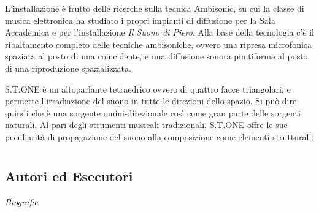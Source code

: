 \documentclass[9pt, twoside, a5paper]{extreport}
\begin{document}
\begin{multicols}{2}

\noindent L'installazione è frutto delle ricerche sulla tecnica Ambisonic, su cui la classe di musica elettronica ha studiato i propri impianti di diffusione per la Sala Accademica e per l'installazione \textit{Il Suono di Piero}. Alla base della tecnologia c'è il ribaltamento completo delle tecniche ambisoniche, ovvero una ripresa microfonica spaziata al posto di una coincidente, e una diffusione sonora puntiforme al posto di una riproduzione spazializzata.

S.T.ONE è un altoparlante tetraedrico ovvero di quattro facce triangolari, e permette l'irradiazione del suono in tutte le direzioni dello spazio. Si può dire quindi che è una sorgente omini-direzionale così come gran parte delle sorgenti naturali. Al pari degli strumenti musicali tradizionali, S.T.ONE offre le sue peculiarità di propagazione del suono alla composizione come elementi strutturali.
\end{multicols}

%
%
%
%
%
	\clearpage
%


\section*{ }

\subsection*{\textsf{Autori ed Esecutori}\\}

{\fontsize{30}{30}\selectfont \textit{Biografie}}

\bigskip
\end{document}
